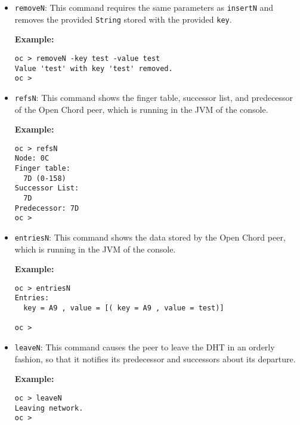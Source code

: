 \begin{itemize}
{\bf Example:}
\begin{verbatim}
oc > retrieveN -key test
Values associated with key 'test':
test
oc >
\end{verbatim}
%
\item {\tt removeN}: This command requires the same parameters as 
{\tt insertN} and removes the provided {\tt String} stored with 
the provided {\tt key}. 

{\bf Example:}
\begin{verbatim}
oc > removeN -key test -value test
Value 'test' with key 'test' removed.
oc >
\end{verbatim}
%
\item {\tt refsN}: This command shows the finger table, successor list, and 
predecessor of the Open Chord peer, which is running in the JVM of the console. 

{\bf Example:}
\begin{verbatim}
oc > refsN
Node: 0C
Finger table:
  7D (0-158)
Successor List:
  7D
Predecessor: 7D
oc >
\end{verbatim}
%
\item {\tt entriesN}: This command shows the data stored by the Open Chord peer, 
which is running in the JVM of the console. 

{\bf Example:}
\begin{verbatim}
oc > entriesN
Entries:
  key = A9 , value = [( key = A9 , value = test)]

oc >
\end{verbatim}
%
\item {\tt leaveN}: This command causes the peer to leave the DHT in an orderly 
fashion, so that it notifies its predecessor and successors about its departure. 

{\bf Example:}
\begin{verbatim}
oc > leaveN
Leaving network.
oc >
\end{verbatim}

\end{itemize}